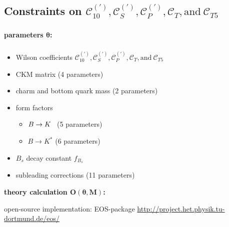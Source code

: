 \documentclass[english]{beamer}
\newcommand{\slide}[2][t]{\begin{frame}[#1] \frametitle{\insertsection} #2 \end{frame}}
\begin{document}
\subsection{Constraints on $\mathcal{C}_{10} ^{(\prime)} , \mathcal{C}_S ^{(\prime)} , \mathcal{C}_P ^{(\prime)} , \mathcal{C}_T , \text{and} ~ \mathcal{C}_{T5}$ }

\slide{

    {\large\textbf{parameters $\boldsymbol{\theta}$:}}

    \frametitle{\insertsubsectionhead}

    \begin{itemize}
        \item Wilson coefficients $\mathcal{C}_{10} ^{(\prime)} , \mathcal{C}_S ^{(\prime)} , \mathcal{C}_P ^{(\prime)} , \mathcal{C}_T , \text{and} ~ \mathcal{C}_{T5}$
        \item CKM matrix (4 parameters)
        \item charm and bottom quark mass (2 parameters)
        \item form factors
              \begin{itemize}
                  \item $B\rightarrow K^{\thinspace\thinspace\thinspace}$ (5 parameters)
                  \item $B\rightarrow K^\ast$                             (6 parameters)
              \end{itemize}
        \item $B_s$ decay constant $f_{B_s}$
        \item subleading corrections (11 parameters)
    \end{itemize}

    \vspace{5mm}

    {\large\textbf{theory calculation $\boldsymbol{O(\theta , M)}$:}}

    \vspace{2.5mm}
    \Large open-source implementation: EOS-package \newline \large \url{http://project.het.physik.tu-dortmund.de/eos/}

}
\end{document}
